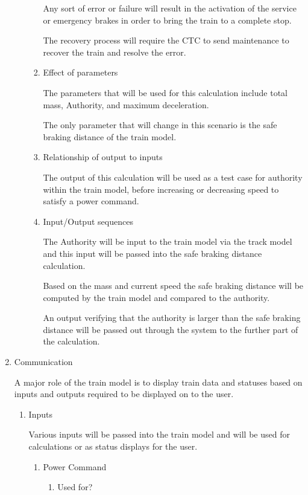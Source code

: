 \documentclass[11pt]{article}
\begin{document}
\begin{enumerate}
\begin{enumerate}
\begin{enumerate}
Any sort of error or failure will result in the activation of the service or emergency brakes in order to bring the train to a complete stop. 

The recovery process will require the CTC to send maintenance to recover the train and resolve the error.
\item Effect of parameters
\label{sec-3-1-4-1-3-6}

The parameters that will be used for this calculation include total mass, Authority, and maximum deceleration. 

The only parameter that will change in this scenario is the safe braking distance of the train model.
\item Relationship of output to inputs
\label{sec-3-1-4-1-3-7}

The output of this calculation will be used as a test case for authority within the train model, before increasing or decreasing speed to satisfy a power command.
\item Input/Output sequences
\label{sec-3-1-4-1-3-8}

The Authority will be input to the train model via the track model and this input will be passed into the safe braking distance calculation. 

Based on the mass and current speed the safe braking distance will be computed by the train model and compared to the authority.

An output verifying that the authority is larger than the safe braking distance will be passed out through the system to the further part of the calculation.
\end{enumerate}
\end{enumerate}
\item Communication
\label{sec-3-1-4-2}

A major role of the train model is to display train data and statuses based on inputs and outputs required to be displayed on to the user. 
\begin{enumerate}
\item Inputs
\label{sec-3-1-4-2-1}

Various inputs will be passed into the train model and will be used for calculations or as status displays for the user.
\begin{enumerate}
\item Power Command
\label{sec-3-1-4-2-1-1}
\begin{enumerate}
\item Used for?
\label{sec-3-1-4-2-1-1-1}


\end{enumerate}
\end{enumerate}
\end{enumerate}
\end{enumerate}
\end{document}
